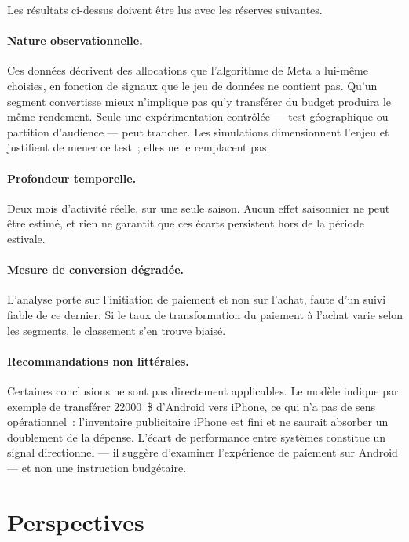 \documentclass[11pt,a4paper]{article}
\begin{document}
Les résultats ci-dessus doivent être lus avec les réserves suivantes.

\paragraph{Nature observationnelle.} Ces données décrivent des allocations que
l'algorithme de Meta a lui-même choisies, en fonction de signaux que le jeu de
données ne contient pas. Qu'un segment convertisse mieux n'implique pas qu'y
transférer du budget produira le même rendement. Seule une expérimentation
contrôlée --- test géographique ou partition d'audience --- peut trancher. Les
simulations dimensionnent l'enjeu et justifient de mener ce test~; elles ne le
remplacent pas.

\paragraph{Profondeur temporelle.} Deux mois d'activité réelle, sur une seule
saison. Aucun effet saisonnier ne peut être estimé, et rien ne garantit que ces
écarts persistent hors de la période estivale.

\paragraph{Mesure de conversion dégradée.} L'analyse porte sur l'initiation de
paiement et non sur l'achat, faute d'un suivi fiable de ce dernier. Si le taux
de transformation du paiement à l'achat varie selon les segments, le classement
s'en trouve biaisé.

\paragraph{Recommandations non littérales.} Certaines conclusions ne sont pas
directement applicables. Le modèle indique par exemple de transférer
\num{22000}~\$ d'Android vers iPhone, ce qui n'a pas de sens opérationnel~:
l'inventaire publicitaire iPhone est fini et ne saurait absorber un doublement
de la dépense. L'écart de performance entre systèmes constitue un signal
directionnel --- il suggère d'examiner l'expérience de paiement sur Android ---
et non une instruction budgétaire.

\section{Perspectives}
\end{document}
